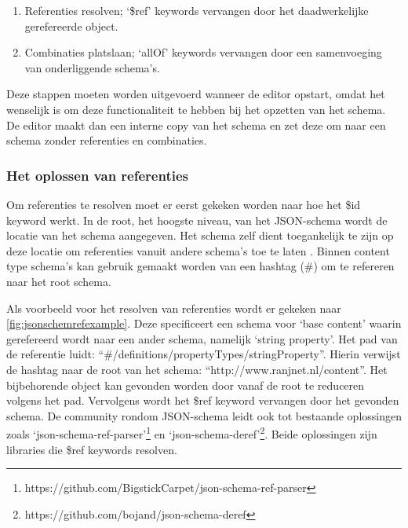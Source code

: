 \begin{enumerate}
    \item Referenties resolven; ‘\$ref’ keywords vervangen door het daadwerkelijke gerefereerde object.
    \item Combinaties platslaan; ‘allOf’ keywords vervangen door een samenvoeging van onderliggende schema’s.
\end{enumerate}

Deze stappen moeten worden uitgevoerd wanneer de editor opstart, omdat het wenselijk is om deze functionaliteit te hebben bij het opzetten van het schema. De editor maakt dan een interne copy van het schema en zet deze om naar een schema zonder referenties en combinaties.

\subsubsection{Het oplossen van referenties}
Om referenties te resolven moet er eerst gekeken worden naar hoe het \$id keyword werkt. In de root, het hoogste niveau, van het JSON-schema wordt de locatie van het schema aangegeven. Het schema zelf dient toegankelijk te zijn op deze locatie om referenties vanuit andere schema’s toe te laten \cite{DraftJSONSchema07}. Binnen content type schema’s kan gebruik gemaakt worden van een hashtag (\#) om te refereren naar het root schema.

Als voorbeeld voor het resolven van referenties wordt er gekeken naar \autoref{fig:jsonschemrefexample}. Deze specificeert een schema voor ‘base content’ waarin gerefereerd wordt naar een ander schema, namelijk ‘string property’. Het pad van de referentie luidt: “\#/definitions/propertyTypes/stringProperty”. Hierin verwijst de hashtag naar de root van het schema: “http://www.ranjnet.nl/content”. Het bijbehorende object kan gevonden worden door vanaf de root te reduceren volgens het pad. Vervolgens wordt het \$ref keyword vervangen door het gevonden schema.
De community rondom JSON-schema leidt ook tot bestaande oplossingen zoals ‘json-schema-ref-parser’\footnote{https://github.com/BigstickCarpet/json-schema-ref-parser} en ‘json-schema-deref’\footnote{https://github.com/bojand/json-schema-deref }. Beide oplossingen zijn libraries die \$ref keywords resolven.


